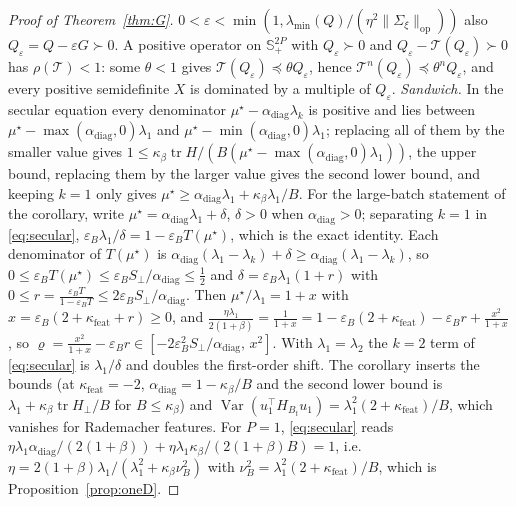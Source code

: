 \documentclass[11pt]{article}
\theoremstyle{remark}
\newcommand{\Var}{\operatorname{Var}}
\newcommand{\tr}{\operatorname{tr}}
\begin{document}
\begin{proof}[Proof of Theorem~\ref{thm:G}]
$0<\varepsilon<\min(1,\lambda_{\min}(Q)/(\eta^2\|\Sigma_\xi\|_{\mathrm{op}}))$ also $Q_\varepsilon=Q-\varepsilon G\succ0$. A positive operator on $\mathbb S_+^{2P}$ with $Q_\varepsilon\succ0$ and $Q_\varepsilon-\mathcal T(Q_\varepsilon)\succ0$ has $\rho(\mathcal T)<1$: some $\theta<1$ gives $\mathcal T(Q_\varepsilon)\preceq\theta Q_\varepsilon$, hence $\mathcal T^n(Q_\varepsilon)\preceq\theta^nQ_\varepsilon$, and every positive semidefinite $X$ is dominated by a multiple of $Q_\varepsilon$.
\emph{Sandwich.} In the secular equation every denominator $\mu^\star-\alpha_{\mathrm{diag}}\lambda_k$ is positive and lies between $\mu^\star-\max(\alpha_{\mathrm{diag}},0)\lambda_1$ and $\mu^\star-\min(\alpha_{\mathrm{diag}},0)\lambda_1$; replacing all of them by the smaller value gives $1\le\kappa_\beta\tr H/(B(\mu^\star-\max(\alpha_{\mathrm{diag}},0)\lambda_1))$, the upper bound, replacing them by the larger value gives the second lower bound, and keeping $k=1$ only gives $\mu^\star\ge\alpha_{\mathrm{diag}}\lambda_1+\kappa_\beta\lambda_1/B$. For the large-batch statement of the corollary, write $\mu^\star=\alpha_{\mathrm{diag}}\lambda_1+\delta$, $\delta>0$ when $\alpha_{\mathrm{diag}}>0$; separating $k=1$ in \eqref{eq:secular}, $\varepsilon_B\lambda_1/\delta=1-\varepsilon_BT(\mu^\star)$, which is the exact identity. Each denominator of $T(\mu^\star)$ is $\alpha_{\mathrm{diag}}(\lambda_1-\lambda_k)+\delta\ge\alpha_{\mathrm{diag}}(\lambda_1-\lambda_k)$, so $0\le\varepsilon_BT(\mu^\star)\le\varepsilon_BS_\perp/\alpha_{\mathrm{diag}}\le\frac12$ and $\delta=\varepsilon_B\lambda_1(1+r)$ with $0\le r=\frac{\varepsilon_BT}{1-\varepsilon_BT}\le2\varepsilon_BS_\perp/\alpha_{\mathrm{diag}}$. Then $\mu^\star/\lambda_1=1+x$ with $x=\varepsilon_B(2+\kappa_{\mathrm{feat}}+r)\ge0$, and $\frac{\eta\lambda_1}{2(1+\beta)}=\frac1{1+x}=1-\varepsilon_B(2+\kappa_{\mathrm{feat}})-\varepsilon_Br+\frac{x^2}{1+x}$, so $\varrho=\frac{x^2}{1+x}-\varepsilon_Br\in[-2\varepsilon_B^2S_\perp/\alpha_{\mathrm{diag}},\,x^2]$. With $\lambda_1=\lambda_2$ the $k=2$ term of \eqref{eq:secular} is $\lambda_1/\delta$ and doubles the first-order shift. The corollary inserts the bounds (at $\kappa_{\mathrm{feat}}=-2$, $\alpha_{\mathrm{diag}}=1-\kappa_\beta/B$ and the second lower bound is $\lambda_1+\kappa_\beta\tr H_\perp/B$ for $B\le\kappa_\beta$) and $\Var(u_1^\top H_{B_t}u_1)=\lambda_1^2(2+\kappa_{\mathrm{feat}})/B$, which vanishes for Rademacher features. For $P=1$, \eqref{eq:secular} reads $\eta\lambda_1\alpha_{\mathrm{diag}}/(2(1+\beta))+\eta\lambda_1\kappa_\beta/(2(1+\beta)B)=1$, i.e.\ $\eta=2(1+\beta)\lambda_1/(\lambda_1^2+\kappa_\beta\nu_B^2)$ with $\nu_B^2=\lambda_1^2(2+\kappa_{\mathrm{feat}})/B$, which is Proposition~\ref{prop:oneD}.
\end{proof}
\end{document}
